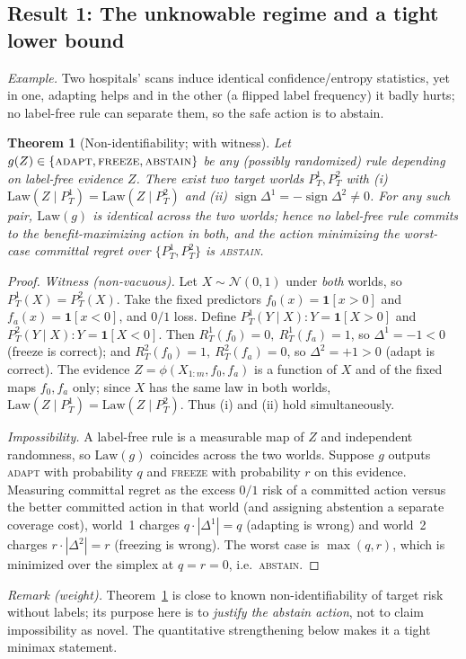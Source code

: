 \documentclass[conference]{IEEEtran}
\theoremstyle{plain}
\newtheorem{theorem}{Theorem}
\theoremstyle{definition}
\newcommand{\sign}{\operatorname{sign}}
\newcommand{\Law}{\mathrm{Law}}
\begin{document}
\subsection{Result 1: The unknowable regime and a tight lower bound}\label{sec:imp}
\noindent\emph{Example.} Two hospitals' scans induce identical confidence/entropy statistics, yet
in one, adapting helps and in the other (a flipped label frequency) it badly hurts; no label-free
rule can separate them, so the safe action is to abstain.
\begin{theorem}[Non-identifiability; with witness]\label{thm:imp}
Let $g(Z)\in\{\textsc{adapt},\textsc{freeze},\textsc{abstain}\}$ be any (possibly
randomized) rule depending on label-free evidence $Z$. There exist two target worlds
$P_T^1,P_T^2$ with
\textup{(i)} $\Law(Z\mid P_T^1)=\Law(Z\mid P_T^2)$ and
\textup{(ii)} $\sign\Delta^1=-\sign\Delta^2\neq 0$.
For any such pair, $\Law(g)$ is identical across the two worlds; hence no label-free
rule commits to the benefit-maximizing action in both, and the action minimizing the
worst-case committal regret over $\{P_T^1,P_T^2\}$ is \textsc{abstain}.
\end{theorem}
\begin{proof}
\emph{Witness (non-vacuous).} Let $X\sim\mathcal N(0,1)$ under \emph{both} worlds, so
$P_T^1(X)=P_T^2(X)$. Take the fixed predictors $f_0(x)=\mathbf 1[x>0]$ and
$f_a(x)=\mathbf 1[x<0]$, and $0/1$ loss. Define
$P_T^1(Y\mid X)\colon Y=\mathbf 1[X>0]$ and $P_T^2(Y\mid X)\colon Y=\mathbf 1[X<0]$.
Then $R_T^1(f_0)=0,\ R_T^1(f_a)=1$, so $\Delta^1=-1<0$ (freeze is correct); and
$R_T^2(f_0)=1,\ R_T^2(f_a)=0$, so $\Delta^2=+1>0$ (adapt is correct). The evidence
$Z=\phi(X_{1:m},f_0,f_a)$ is a function of $X$ and of the fixed maps $f_0,f_a$ only;
since $X$ has the same law in both worlds, $\Law(Z\mid P_T^1)=\Law(Z\mid P_T^2)$.
Thus (i) and (ii) hold simultaneously.

\emph{Impossibility.} A label-free rule is a measurable map of $Z$ and independent
randomness, so $\Law(g)$ coincides across the two worlds. Suppose $g$ outputs
\textsc{adapt} with probability $q$ and \textsc{freeze} with probability $r$ on this
evidence. Measuring committal regret as the excess $0/1$ risk of a committed action
versus the better committed action in that world (and assigning abstention a separate
coverage cost), world~1 charges $q\cdot|\Delta^1|=q$ (adapting is wrong) and world~2
charges $r\cdot|\Delta^2|=r$ (freezing is wrong). The worst case is $\max(q,r)$, which
is minimized over the simplex at $q=r=0$, i.e.\ \textsc{abstain}. \qedhere
\end{proof}
\noindent\emph{Remark (weight).} Theorem~\ref{thm:imp} is close to known
non-identifiability of target risk without labels; its purpose here is to
\emph{justify the abstain action}, not to claim impossibility as novel. The
quantitative strengthening below makes it a tight minimax statement.
\end{document}
